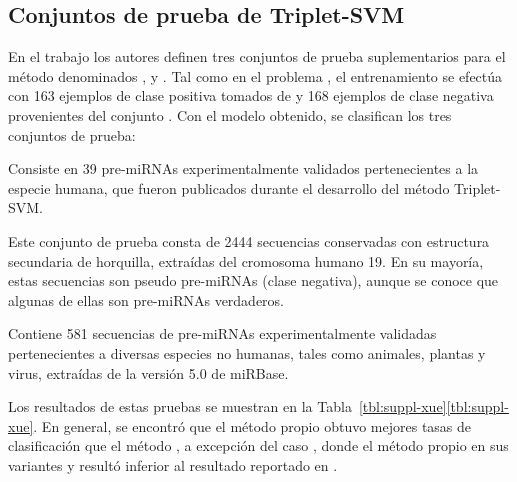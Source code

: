 %
%
\subsection{Conjuntos de prueba de Triplet-SVM}
%
En el trabajo \cite{xue} los autores definen tres conjuntos de prueba
suplementarios para el método \work\tripletsvm{} denominados
,  y .
Tal como en el problema \tripletsvm{}, el entrenamiento se efectúa con
163 ejemplos de clase positiva tomados de  y 168
ejemplos de clase negativa provenientes del conjunto .
Con el modelo obtenido, se clasifican los tres conjuntos de prueba:
%
\begin{description}
  \item{}
  Consiste en 39 pre-miRNAs experimentalmente validados pertenecientes a
  la especie humana, que fueron publicados durante el desarrollo del
  método Triplet-SVM.
%
  \item{}
  Este conjunto de prueba consta de 2444 secuencias conservadas con
  estructura secundaria de horquilla, extraídas del cromosoma humano
  19. En su mayoría, estas secuencias son pseudo pre-miRNAs (clase
  negativa), aunque se conoce que algunas de ellas son
  pre-miRNAs verdaderos.
%
  \item{}
  Contiene 581 secuencias de pre-miRNAs experimentalmente validadas
  pertenecientes a diversas especies no humanas, tales como animales,
  plantas y virus, extraídas de la versión 5.0 de miRBase.
\end{description}
%
Los resultados de estas pruebas se muestran en la
\iflatexml{}Tabla~\ref{tbl:suppl-xue}\else\autoref{tbl:suppl-xue}\fi.
En general, se encontró que el método propio obtuvo mejores tasas de
clasificación que el método \work\tripletsvm{}, a excepción del caso
, donde el método propio en sus variantes
 y  resultó inferior al resultado reportado en
\cite{xue}.
